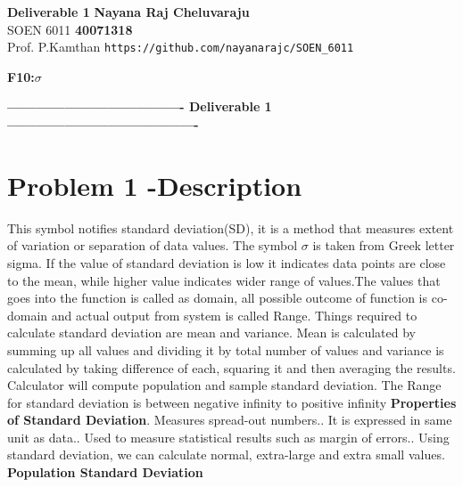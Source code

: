 \documentclass[a4paper,12pt]{article}
\begin{document}
\begin{titlepage}
\noindent
\large\textbf{Deliverable 1} \hfill \textbf{Nayana Raj Cheluvaraju} \\
\normalsize SOEN 6011 \hfill \textbf{40071318} \\
Prof. P.Kamthan 
\hspace*{\fill}\texttt{{https://github.com/}{nayanarajc/SOEN\_6011}}\\
\newline
    \begin{center}
        \large\textbf{F10:$\sigma$}
    \end{center}

\textbf{-------------------------------------  Deliverable 1   ----------------------------------------}

\section{Problem 1 -Description}
This symbol notifies standard deviation(SD), it is a method that measures extent of variation or separation of data values. The symbol $\sigma$  is taken from Greek letter sigma. If the value of standard deviation is low it indicates data points are close to the mean, while higher value indicates wider range of values.The values that goes into the function is called as domain, all possible outcome of function is co-domain and actual output from system is called Range. Things required to calculate standard deviation are mean and variance. Mean is calculated by summing up all values and dividing it by total number of values and variance is calculated by taking difference of each, squaring it and then averaging the results. Calculator will compute population and sample standard deviation.\newline
The Range for standard deviation is between negative infinity to positive infinity\newline
\textbf{Properties of Standard Deviation}.	Measures spread-out numbers..	It is expressed in same unit as data..	Used to measure statistical results such as margin of errors..	Using standard deviation, we can calculate normal, extra-large and extra small values.
\newline
\newline
\textbf{Population Standard Deviation}
\newline

\end{titlepage}
\end{document}
